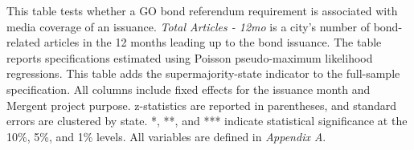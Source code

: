 \newpage
\begin{table}[H]\centering
\caption*{\textbf{Supermajority approval requirements and media coverage}}
\label{tab:super_media}
\parbox{\textwidth}{This table tests whether a GO bond referendum requirement is associated with media coverage of an issuance. \textit{Total Articles - 12mo} is a city's number of bond-related articles in the 12 months leading up to the bond issuance. The table reports specifications estimated using Poisson pseudo-maximum likelihood regressions. This table adds the supermajority-state indicator to the full-sample specification. All columns include fixed effects for the issuance month and Mergent project purpose. z-statistics are reported in parentheses, and standard errors are clustered by state. *, **, and *** indicate statistical significance at the 10\%, 5\%, and 1\% levels. All variables are defined in \textit{Appendix A}.}
\end{table}

